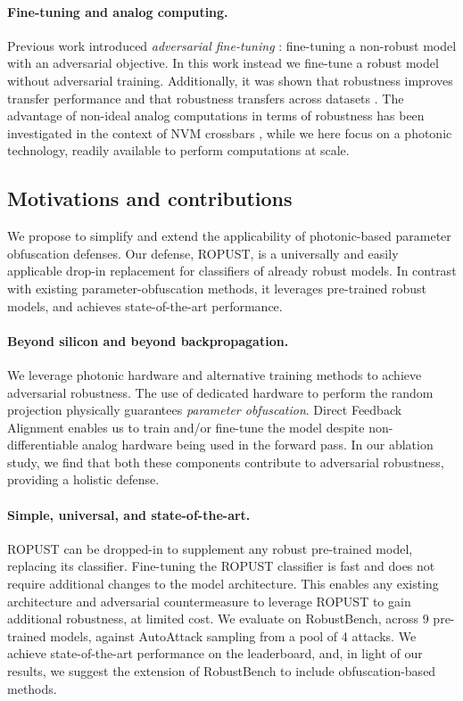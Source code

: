 \paragraph{Fine-tuning and analog computing.} Previous work introduced \textit{adversarial fine-tuning} \cite{Jeddi2020ASF}: fine-tuning a non-robust model with an adversarial objective. In this work instead we fine-tune a robust model without adversarial training. Additionally, it was shown that robustness improves transfer performance \cite{Salman2020DoAR} and that robustness transfers across datasets \cite{Shafahi2020AdversariallyRT}. The advantage of non-ideal analog computations in terms of robustness has been investigated in the context of NVM crossbars \cite{roy2020robustness}, while we here focus on a photonic technology, readily available to perform computations at scale.

\subsection{Motivations and contributions}

We propose to simplify and extend the applicability of photonic-based parameter obfuscation defenses. Our defense, ROPUST, is a universally and easily applicable drop-in replacement for classifiers of already robust models. In contrast with existing parameter-obfuscation methods, it leverages pre-trained robust models, and achieves state-of-the-art performance. 

\paragraph{Beyond silicon and beyond backpropagation.} We leverage photonic hardware and alternative training methods to achieve adversarial robustness. The use of dedicated hardware to perform the random projection physically guarantees \emph{parameter obfuscation}. Direct Feedback Alignment enables us to train and/or fine-tune the model despite non-differentiable analog hardware being used in the forward pass. In our ablation study, we find that both these components contribute to adversarial robustness, providing a holistic defense.

\paragraph{Simple, universal, and state-of-the-art.} ROPUST can be dropped-in to supplement any robust pre-trained model, replacing its classifier. Fine-tuning the ROPUST classifier is fast and does not require additional changes to the model architecture. This enables any existing architecture and adversarial countermeasure to leverage ROPUST to gain additional robustness, at limited cost.  We evaluate on RobustBench, across 9 pre-trained models, against AutoAttack sampling from a pool of 4 attacks. We achieve state-of-the-art performance on the leaderboard, and, in light of our results, we suggest the extension of RobustBench to include obfuscation-based methods. 

